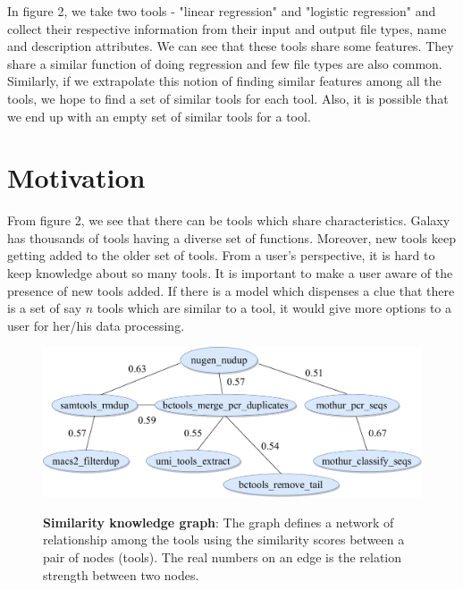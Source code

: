 In figure 2, we take two tools - "linear regression" and "logistic regression" and collect their respective information from their input and output file types, name and description attributes. We can see that these tools share some features. They share a similar function of doing regression and few file types are also common. Similarly, if we extrapolate this notion of finding similar features among all the tools, we hope to find a set of similar tools for each tool. Also, it is possible that we end up with an empty set of similar tools for a tool.

\section{Motivation}
From figure 2, we see that there can be tools which share characteristics. Galaxy has thousands of tools having a diverse set of functions. Moreover, new tools keep getting added to the older set of tools. From a user's perspective, it is hard to keep knowledge about so many tools. It is important to make a user aware of the presence of new tools added. If there is a model which dispenses a clue that there is a set of say $n$ tools which are similar to a tool, it would give more options to a user for her/his data processing. 

\begin{figure}[h]
\begin{centering}
    {\includegraphics[scale=0.6]{figures/tools_sim_know_graph.pdf}}
    \caption[Similarity knowledge graph]{\textbf{Similarity knowledge graph}: The graph defines a network of relationship among the tools using the similarity scores between a pair of nodes (tools). The real numbers on an edge is the relation strength between two nodes.}
\end{centering}
\end{figure}

